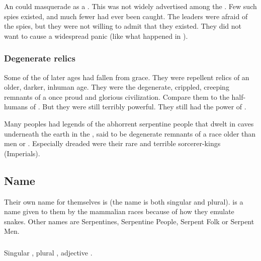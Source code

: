 An \ophidian could masquerade as a \bezed. 
This was not widely advertised among the \resphain.
Few such spies existed, and much fewer had ever been caught. 
The \resphan leaders were afraid of the spies, but they were not willing to admit that they existed.
They did not want to cause a widespread panic (like what happened in \cite{TV:BattlestarGalactica}).





\subsubsection{Degenerate relics}
Some of the \ophidian {} of later ages had fallen from grace.
They were repellent relics of an older, darker, inhuman age. 
They were the degenerate, crippled, creeping remnants of a once proud and glorious civilization. 
Compare them to the half-humans of \cite{RobertEHoward:WormsoftheEarth}. 
But they were still terribly powerful.
They still had the power of . 

Many peoples had legends of the abhorrent serpentine people that dwelt in caves underneath the earth in the \wylde, said to be degenerate remnants of a race older than men or \scathae. 
Especially dreaded were their rare and terrible sorcerer-kings (Imperials).









\subsection{Name}
Their own name for themselves is \caisith (the name is both singular and plural). 
\quo{\Ophidian} is a name given to them by the mammalian races because of how they emulate snakes. 
Other names are Serpentines, Serpentine People, Serpent Folk or Serpent Men. 





\subsubsection{\QuilJaar}
Singular \emph{\quiljaar{}}, plural \emph{\quiljaaran{}}, adjective \emph{\quiljaaran{}}. 









